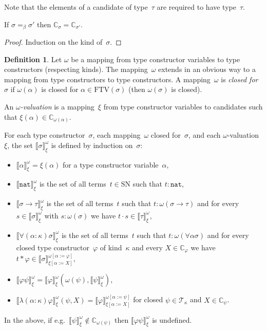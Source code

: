 \documentclass[a4paper,UKenglish,cleveref,autoref,numberwithinsect]{lipics-v2019}
\theoremstyle{definition}
\newtheorem{defn}[theorem]{Definition}
\newcommand{\arrtype}{\rightarrow}
\newcommand{\app}[2]{#1 \cdot #2}
\newcommand{\tapp}[2]{#1 * #2}
\newcommand{\subst}[2]{#1:=#2}
\newcommand{\nat}{\mathtt{nat}}
\newcommand{\FTV}{\mathrm{FTV}}
\newcommand{\Tc}{\mathcal{T}}
\newcommand{\SN}{\mathrm{SN}}
\newcommand{\Cb}{\mathbb{C}}
\newcommand{\val}[3]{\ensuremath{\llbracket#1\rrbracket_{#2}^{#3}}}
\begin{document}
Note that the elements of a candidate of type~$\tau$ are required to
have type~$\tau$.

\begin{lemma}\label{lem_beta_candidate}
  If $\sigma =_\beta \sigma'$ then $\Cb_\sigma = \Cb_{\sigma'}$.
\end{lemma}

\begin{proof}
  Induction on the kind of~$\sigma$.
\end{proof}

\begin{defn}\label{def_computability_valuation}
  Let $\omega$ be a mapping from type constructor variables to type
  constructors (respecting kinds). The mapping~$\omega$ extends in an
  obvious way to a mapping from type constructors to type
  constructors. A mapping~$\omega$ is \emph{closed for~$\sigma$} if
  $\omega(\alpha)$ is closed for $\alpha \in \FTV(\sigma)$ (then
  $\omega(\sigma)$ is closed).

  An \emph{$\omega$-valuation} is a mapping~$\xi$ from type
  constructor variables to candidates such that $\xi(\alpha) \in
  \Cb_{\omega(\alpha)}$.

  For each type constructor~$\sigma$, each mapping~$\omega$ closed
  for~$\sigma$, and each $\omega$-valuation~$\xi$, the set
  $\val{\sigma}{\xi}{\omega}$ is defined by induction on~$\sigma$:
  \begin{itemize}
  \item $\val{\alpha}{\xi}{\omega} = \xi(\alpha)$ for a type
    constructor variable~$\alpha$,
  \item $\val{\nat}{\xi}{\omega}$ is the set of all terms~$t \in \SN$
    such that $t : \nat$,
  \item $\val{\sigma \arrtype \tau}{\xi}{\omega}$ is the set of all
    terms~$t$ such that $t : \omega(\sigma\arrtype\tau)$ and for
    every~$s \in \val{\sigma}{\xi}{\omega}$ with $s : \omega(\sigma)$
    we have $\app{t}{s} \in \val{\tau}{\xi}{\omega}$,
  \item $\val{\forall(\alpha:\kappa)\sigma}{\xi}{\omega}$ is the set
    of all terms~$t$ such that $t : \omega(\forall\alpha\sigma)$ and
    for every closed type constructor~$\varphi$ of kind~$\kappa$ and
    every $X \in \Cb_\varphi$ we have $\tapp{t}{\varphi} \in
    \val{\sigma}{\xi[\subst{\alpha}{X}]}{\omega[\subst{\alpha}{\varphi}]}$,
  \item
    $\val{\varphi \psi}{\xi}{\omega} =
    \val{\varphi}{\xi}{\omega}(\omega(\psi),\val{\psi}{\xi}{\omega})$,
  \item
    $\val{\lambda(\alpha:\kappa)\varphi}{\xi}{\omega}(\psi,X) =
    \val{\varphi}{\xi[\subst{\alpha}{X}]}{\omega[\subst{\alpha}{\psi}]}$
    for closed $\psi \in \Tc_\kappa$ and $X \in \Cb_\psi$.
  \end{itemize}
  In the above, if e.g.~$\val{\psi}{\xi}{\omega} \notin
  \Cb_{\omega(\psi)}$ then $\val{\varphi \psi}{\xi}{\omega}$ is
  undefined.
\end{defn}
\end{document}
